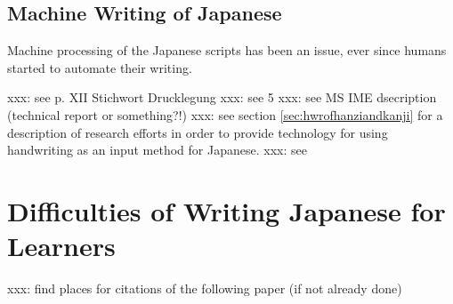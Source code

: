 \subsection{Machine Writing of Japanese}
\label{sec:machinewritingofjapanese}

Machine processing of the Japanese scripts has been an issue, ever since humans
started to automate their writing.

xxx: see  p. XII Stichwort Drucklegung
xxx: see  5
xxx: see MS IME dsecription (technical report or something?!)
xxx: see section \ref{sec:hwrofhanziandkanji} for a description of research 
efforts in order to provide technology for using handwriting as an input method 
for Japanese.
xxx: see 


\section{Difficulties of Writing Japanese for Learners}
\label{sec:writingjapanesedifficulties}


xxx: find places for citations of the following paper (if not already done)
